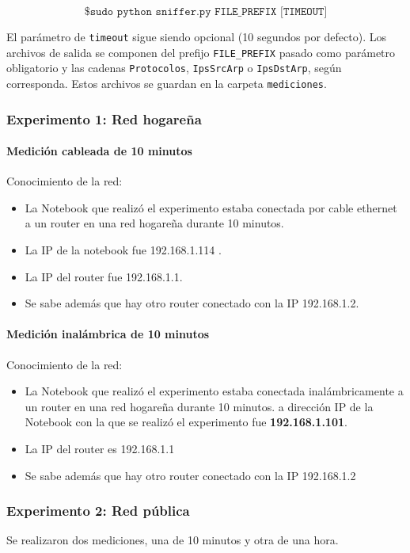 \[
\texttt{\$ sudo python sniffer.py FILE\_PREFIX [TIMEOUT]}
\]

El parámetro de \texttt{timeout} sigue siendo opcional (10 segundos por defecto). Los archivos de salida
se componen del prefijo \texttt{FILE\_PREFIX} pasado como parámetro obligatorio y las cadenas \texttt{Protocolos},
\texttt{IpsSrcArp} o \texttt{IpsDstArp}, según corresponda. Estos archivos se guardan en la carpeta \texttt{mediciones}.

\subsubsection{Experimento 1: Red hogareña}
\paragraph{Medición cableada de 10 minutos}

Conocimiento de la red:
\begin{itemize} 
\item La Notebook que realizó el experimento estaba conectada por cable ethernet a un router en una red hogareña durante 10 minutos.
\item La IP de la notebook fue 192.168.1.114 .
\item La IP del router fue 192.168.1.1.
\item Se sabe además que hay otro router conectado con la IP 192.168.1.2.
\end{itemize}

\paragraph{Medición inalámbrica de 10 minutos}

Conocimiento de la red:
\begin{itemize}
\item La Notebook que realizó el experimento estaba conectada inalámbricamente a un router en una red hogareña durante 10 minutos.
a dirección IP de la Notebook con la que se realizó el experimento fue \textbf{192.168.1.101}.
\item La IP del router es 192.168.1.1
\item Se sabe además que hay otro router conectado con la IP 192.168.1.2
\end{itemize}

\subsubsection{Experimento 2: Red pública}
Se realizaron dos mediciones, una de 10 minutos y otra de una hora.

